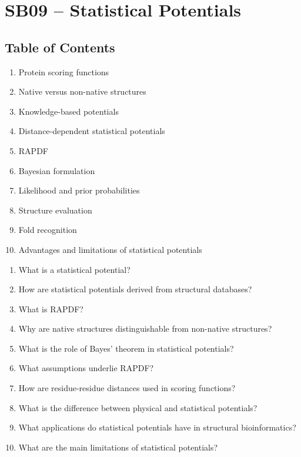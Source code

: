 \section{SB09 -- Statistical Potentials}

\subsection*{Table of Contents}

\begin{enumerate}
\item Protein scoring functions
\item Native versus non-native structures
\item Knowledge-based potentials
\item Distance-dependent statistical potentials
\item RAPDF
\item Bayesian formulation
\item Likelihood and prior probabilities
\item Structure evaluation
\item Fold recognition
\item Advantages and limitations of statistical potentials
\end{enumerate}

\begin{enumerate}
\item{What is a statistical potential?}
\item{How are statistical potentials derived from structural databases?}
\item{What is RAPDF?}
\item{Why are native structures distinguishable from non-native structures?}
\item{What is the role of Bayes' theorem in statistical potentials?}
\item{What assumptions underlie RAPDF?}
\item{How are residue-residue distances used in scoring functions?}
\item{What is the difference between physical and statistical potentials?}
\item{What applications do statistical potentials have in structural bioinformatics?}
\item{What are the main limitations of statistical potentials?}
\end{enumerate}